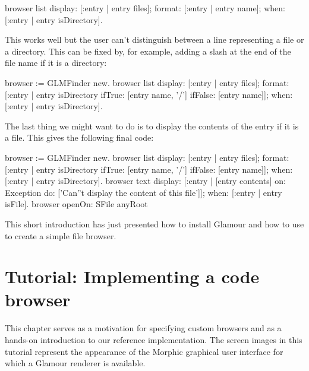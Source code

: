 \documentclass[a4paper,10pt,twoside]{book}
\begin{document}
\begin{code}{}
browser list
  display: [:entry | entry files];
  format: [:entry | entry name];
  when: [:entry | entry isDirectory].
\end{code}

This works well but the user can't distinguish between a line
representing a file or a directory. This can be fixed by, for example,
adding a slash at the end of the file name if it is a directory:

\begin{code}{}
browser := GLMFinder new.
browser list
  display: [:entry | entry files];
  format: [:entry | entry isDirectory
                                   ifTrue: [entry name, '/']
                                   ifFalse: [entry name]];
  when: [:entry | entry isDirectory].
\end{code}

The last thing we might want to do is to display the contents of the
entry if it is a file. This gives the following final code:

\begin{code}{}
browser := GLMFinder new.
browser list
  display: [:entry | entry files];
  format: [:entry | entry isDirectory
                                   ifTrue: [entry name, '/']
                                   ifFalse: [entry name]];
  when: [:entry | entry isDirectory].
browser text
	display: [:entry | [entry contents]
                                   on: Exception
                                   do: ['Can''t display the content of this file']];
	when: [:entry | entry isFile].
browser openOn: SFile anyRoot
\end{code}


This short introduction has just presented how to install Glamour and
how to use to create a simple file browser.

\section{Tutorial: Implementing a code browser}

This chapter serves as a motivation for specifying custom browsers and
as a hands-on introduction to our reference implementation. The screen
images in this tutorial represent the appearance of the Morphic
graphical user interface for which a Glamour renderer is available.

\end{document}
